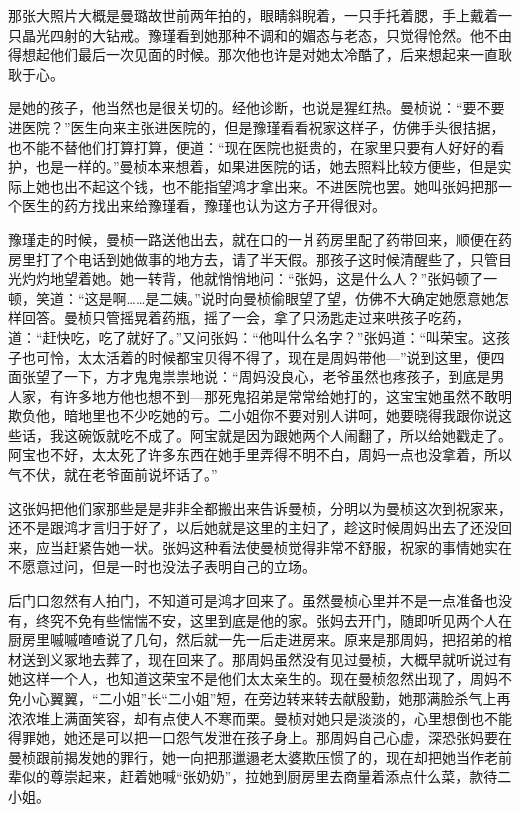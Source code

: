 \par 那张大照片大概是曼璐故世前两年拍的，眼睛斜睨着，一只手托着腮，手上戴着一只晶光四射的大钻戒。豫瑾看到她那种不调和的媚态与老态，只觉得怆然。他不由得想起他们最后一次见面的时候。那次他也许是对她太冷酷了，后来想起来一直耿耿于心。
\par 是她的孩子，他当然也是很关切的。经他诊断，也说是猩红热。曼桢说：“要不要进医院？”医生向来主张进医院的，但是豫瑾看看祝家这样子，仿佛手头很拮据，也不能不替他们打算打算，便道：“现在医院也挺贵的，在家里只要有人好好的看护，也是一样的。”曼桢本来想着，如果进医院的话，她去照料比较方便些，但是实际上她也出不起这个钱，也不能指望鸿才拿出来。不进医院也罢。她叫张妈把那一个医生的药方找出来给豫瑾看，豫瑾也认为这方子开得很对。
\par 豫瑾走的时候，曼桢一路送他出去，就在口的一爿药房里配了药带回来，顺便在药房里打了个电话到她做事的地方去，请了半天假。那孩子这时候清醒些了，只管目光灼灼地望着她。她一转背，他就悄悄地问：“张妈，这是什么人？”张妈顿了一顿，笑道：“这是啊……是二姨。”说时向曼桢偷眼望了望，仿佛不大确定她愿意她怎样回答。曼桢只管摇晃着药瓶，摇了一会，拿了只汤匙走过来哄孩子吃药，道：“赶快吃，吃了就好了。”又问张妈：“他叫什么名字？”张妈道：“叫荣宝。这孩子也可怜，太太活着的时候都宝贝得不得了，现在是周妈带他—”说到这里，便四面张望了一下，方才鬼鬼祟祟地说：“周妈没良心，老爷虽然也疼孩子，到底是男人家，有许多地方他也想不到—那死鬼招弟是常常给她打的，这宝宝她虽然不敢明欺负他，暗地里也不少吃她的亏。二小姐你不要对别人讲呵，她要晓得我跟你说这些话，我这碗饭就吃不成了。阿宝就是因为跟她两个人闹翻了，所以给她戳走了。阿宝也不好，太太死了许多东西在她手里弄得不明不白，周妈一点也没拿着，所以气不伏，就在老爷面前说坏话了。”
\par 这张妈把他们家那些是是非非全都搬出来告诉曼桢，分明以为曼桢这次到祝家来，还不是跟鸿才言归于好了，以后她就是这里的主妇了，趁这时候周妈出去了还没回来，应当赶紧告她一状。张妈这种看法使曼桢觉得非常不舒服，祝家的事情她实在不愿意过问，但是一时也没法子表明自己的立场。
\par 后门口忽然有人拍门，不知道可是鸿才回来了。虽然曼桢心里并不是一点准备也没有，终究不免有些惴惴不安，这里到底是他的家。张妈去开门，随即听见两个人在厨房里嘁嘁喳喳说了几句，然后就一先一后走进房来。原来是那周妈，把招弟的棺材送到义冢地去葬了，现在回来了。那周妈虽然没有见过曼桢，大概早就听说过有她这样一个人，也知道这荣宝不是他们太太亲生的。现在曼桢忽然出现了，周妈不免小心翼翼，“二小姐”长“二小姐”短，在旁边转来转去献殷勤，她那满脸杀气上再浓浓堆上满面笑容，却有点使人不寒而栗。曼桢对她只是淡淡的，心里想倒也不能得罪她，她还是可以把一口怨气发泄在孩子身上。那周妈自己心虚，深恐张妈要在曼桢跟前揭发她的罪行，她一向把那邋遢老太婆欺压惯了的，现在却把她当作老前辈似的尊崇起来，赶着她喊“张奶奶”，拉她到厨房里去商量着添点什么菜，款待二小姐。
